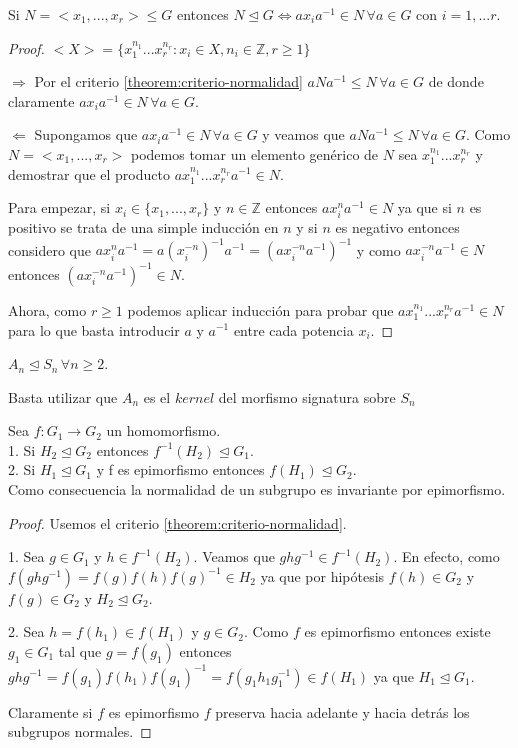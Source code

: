 \begin{nprop}
Si $N = <x_1,...,x_r>  \le G$ entonces $N \unlhd G \iff ax_ia^{-1} \in N \, \forall a \in G$ con $i = 1,...r$.
\end{nprop}
\begin{proof}
$<X> = \{x_1^{n_1}...x_r^{n_r}:x_i \in X,n_i \in \mathbb{Z},r \ge 1\}$

$\Rightarrow$ Por el criterio \ref{theorem:criterio-normalidad} $aNa^{-1} \le N \, \forall a \in G$ de donde claramente $ax_ia^{-1} \in N \, \forall a \in G$.

$\Leftarrow$ Supongamos que $ax_ia^{-1} \in N \, \forall a \in G$ y veamos que $aNa^{-1} \le N \, \forall a \in G$. Como $N = <x_1,...,x_r>$ podemos tomar un elemento genérico de $N$ sea $x_1^{n_1}...x_r^{n_r}$ y demostrar que el producto $ax_1^{n_1}...x_r^{n_r}a^{-1} \in N$.

Para empezar, si $x_i \in \{x_1,...,x_r\}$ y $n \in \mathbb{Z}$ entonces $ax_i^na^{-1} \in N$ ya que si $n$ es positivo se trata de una simple inducción en $n$ y si $n$ es negativo entonces considero que $ax_i^na^{-1} = a(x_i^{-n})^{-1}a^{-1} = (ax_i^{-n}a^{-1})^{-1}$ y como $ax_i^{-n}a^{-1} \in N$ entonces $(ax_i^{-n}a^{-1})^{-1} \in N$.

Ahora, como $r \ge 1$ podemos aplicar inducción para probar que $ax_1^{n_1}...x_r^{n_r}a^{-1} \in N$ para lo que basta introducir $a$ y $a^{-1}$ entre cada potencia $x_i$.
\end{proof}

\begin{ejemplo}
$A_n \trianglelefteq S_n \, \forall n \geq 2$.

Basta utilizar que $A_n$ es el $kernel$ del morfismo signatura sobre $S_n$
\end{ejemplo}

\begin{nth}
Sea $f: G_1 \rightarrow G_2$ un homomorfismo.\\
1. Si $H_2 \trianglelefteq G_2$ entonces $f^{-1}(H_2) \trianglelefteq G_1$. \\
2. Si $H_1 \trianglelefteq G_1$ y f es epimorfismo entonces $f(H_1) \trianglelefteq G_2$. \\
Como consecuencia la normalidad de un subgrupo es invariante por epimorfismo.
\end{nth}
\begin{proof}
Usemos el criterio \ref{theorem:criterio-normalidad}. 

1. Sea $g \in G_1$ y $h \in f^{-1}(H_2)$. Veamos que $ghg^{-1} \in f^{-1}(H_2)$. En efecto, como $f(ghg^{-1}) = f(g)f(h)f(g)^{-1} \in H_2$ ya que por hipótesis $f(h) \in G_2$ y $f(g) \in G_2$ y $H_2 \trianglelefteq G_2$.

2. Sea $h=f(h_1) \in f(H_1)$ y $g \in G_2$. Como $f$ es epimorfismo entonces existe $g_1 \in G_1$ tal que $g = f(g_1)$ entonces $ghg^{-1} = f(g_1)f(h_1)f(g_1)^{-1} = f(g_1h_1g_1^{-1}) \in f(H_1)$ ya que $H_1 \trianglelefteq G_1$.

Claramente si $f$ es epimorfismo $f$ preserva hacia adelante y hacia detrás los subgrupos normales.
\end{proof}

